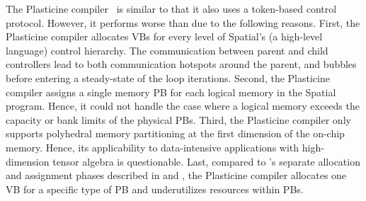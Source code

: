 The Plasticine compiler~\cite{plasticine} is similar to \name{} that it also uses a token-based control protocol.
However, it performs worse than \name{} due to the following reasons.
First, the Plasticine compiler allocates VBs for every level of Spatial's (a high-level language) control hierarchy. 
The communication between parent and child controllers lead to both communication hotspots around the parent, and bubbles before entering a steady-state of the loop iterations. 
Second, the Plasticine compiler assigns a single memory PB for each logical memory in the Spatial program. 
Hence, it could not handle the case where a logical memory exceeds the capacity or bank limits of the physical PBs.
Third, the Plasticine compiler only supports polyhedral memory partitioning at the first dimension of the on-chip memory. 
Hence, its applicability to data-intensive applications with high-dimension tensor algebra is questionable.
Last, compared to \name{}'s separate allocation and assignment phases described in  and ,
the Plasticine compiler allocates one VB for a specific type of PB and underutilizes resources within PBs.






